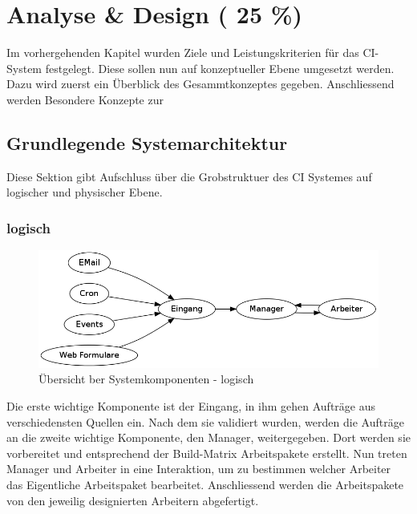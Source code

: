 \chapter{Analyse \& Design ( 25 \%)}
\label{chap:design}


Im vorhergehenden Kapitel wurden Ziele und Leistungskriterien f\"ur das CI-System festgelegt.
Diese sollen nun auf konzeptueller Ebene umgesetzt werden.
Dazu wird zuerst ein \"Uberblick des Gesammtkonzeptes gegeben.
Anschliessend werden Besondere Konzepte zur 


\section{Grundlegende Systemarchitektur}
\label{sec:design:sysarch}
Diese Sektion gibt Aufschluss \"uber die Grobstruktuer des CI Systemes auf logischer und physischer Ebene.

\subsection{logisch}

\begin{figure}[ht]
  \centering
  \label{fig:grob-layout-komponenten-logisch}
  \includegraphics[width=\textwidth]{imageinput/grob-layout-komponenten-logisch.png}
  \caption{\"Ubersicht ber Systemkomponenten - logisch}
\end{figure}


Die erste wichtige Komponente ist der Eingang,
in ihm gehen Auftr\"age aus verschiedensten Quellen ein.
Nach dem sie validiert wurden, werden die Auftr\"age an
die zweite wichtige Komponente, den Manager, weitergegeben.
Dort werden sie vorbereitet und entsprechend der Build-Matrix Arbeitspakete erstellt.
Nun treten Manager und Arbeiter in eine Interaktion,
um zu bestimmen welcher Arbeiter das Eigentliche Arbeitspaket bearbeitet.
Anschliessend werden die Arbeitspakete von den jeweilig designierten Arbeitern abgefertigt.



